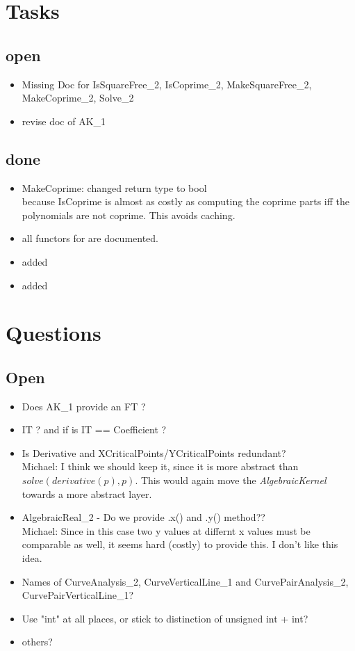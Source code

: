 
\section{Tasks}

\subsection{open}
\begin{itemize}
\item Missing Doc for IsSquareFree\_2, IsCoprime\_2, MakeSquareFree\_2,
   MakeCoprime\_2, Solve\_2
\item revise doc of AK\_1 
\end{itemize}

\subsection{done} 
\begin{itemize}
\item MakeCoprime: changed return type to bool\\
      because IsCoprime is almost as costly as computing the coprime parts iff the polynomials are not coprime. This avoids caching. 
\item all functors for  
      are documented.
\item added 
\item added  
\end{itemize}


\section{Questions}
\subsection{Open}
\begin{itemize}
 \item Does AK\_1 provide an FT ?
 \item IT ? and if is IT == Coefficient ?
 \item Is Derivative and XCriticalPoints/YCriticalPoints redundant?\\
       Michael: I think we should keep it, since it is more abstract than $solve(derivative(p),p)$.  This would again move the {\em AlgebraicKernel} towards a more abstract layer. 
 \item AlgebraicReal\_2 - Do we provide .x() and .y() method??\\
       Michael: Since in this case two y values at differnt x values must be comparable as well, it seems hard (costly) to provide this.  
 I don't like this idea.  

 \item Names of CurveAnalysis\_2, CurveVerticalLine\_1 and
   CurvePairAnalysis\_2, CurvePairVerticalLine\_1?
 \item Use "int" at all places, or stick to distinction of unsigned int + int?
 \item others?
\end{itemize}


